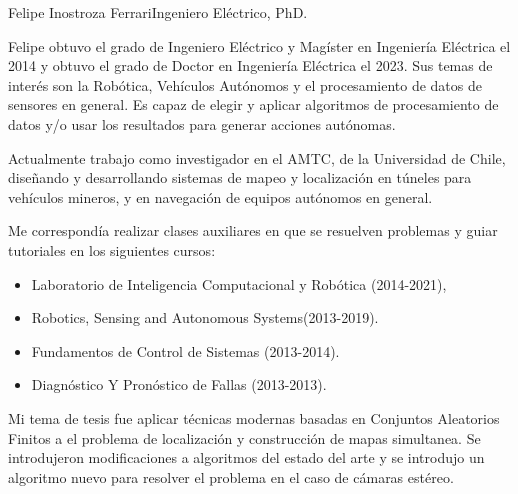 \documentclass{article}
\begin{document}
\begin{cv}[avatar]{Felipe Inostroza Ferrari}{Ingeniero Eléctrico, PhD.}



 Felipe obtuvo el grado de Ingeniero Eléctrico y Magíster en Ingeniería Eléctrica el 2014 y obtuvo el grado de Doctor en Ingeniería Eléctrica el 2023. Sus temas de interés son la Robótica, Vehículos Autónomos y el procesamiento de datos de sensores en general. Es capaz de elegir y aplicar algoritmos de procesamiento de datos y/o usar los resultados para generar acciones autónomas. 


\begin{cvevent}[2019][present]
    Actualmente trabajo como investigador en el AMTC, de la Universidad de Chile, diseñando y desarrollando sistemas de mapeo y localización en túneles para vehículos mineros, y en navegación de equipos autónomos en general. 
\end{cvevent}

\begin{cvevent}[2014][2021]
    Me correspondía realizar clases auxiliares en que se resuelven problemas y guiar tutoriales en los siguientes cursos:
    \begin{itemize}
        \item Laboratorio de Inteligencia Computacional y Robótica (2014-2021),
        \item Robotics, Sensing and Autonomous Systems(2013-2019).
        \item Fundamentos de Control de Sistemas (2013-2014).
        \item Diagnóstico Y Pronóstico de Fallas (2013-2013).
    \end{itemize}
\end{cvevent}



\begin{cvevent}[2014][2023]
Mi tema de tesis fue aplicar técnicas modernas basadas en Conjuntos Aleatorios Finitos a el problema de localización y construcción de mapas simultanea. Se introdujeron modificaciones a algoritmos del estado del arte y se introdujo un algoritmo nuevo para resolver el problema en el caso de cámaras estéreo.
\end{cvevent}


\end{cv}
\end{document}
